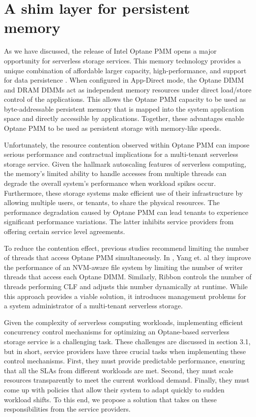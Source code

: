 \chapter[A shim Layer for persistent memory]{A shim layer for persistent memory}

As we have discussed, the release of Intel Optane PMM opens a major opportunity for serverless storage services. This memory technology provides a unique combination of affordable larger capacity, high-performance, and support for data persistence \cite{IntelOp15:online}. When configured in App-Direct mode, the Optane DIMM and DRAM DIMMs act as independent memory resources under direct load/store control of the applications. This allows the Optane PMM capacity to be used as byte-addressable persistent memory that is mapped into the system application space and directly accessible by applications. Together, these advantages enable Optane PMM to be used as persistent storage with memory-like speeds.

Unfortunately, the resource contention observed within Optane PMM can impose serious performance and contractual implications for a multi-tenant serverless storage service. Given the hallmark autoscaling features of serverless computing, the memory’s limited ability to handle accesses from multiple threads can degrade the overall system’s performance when workload spikes occur. Furthermore, these storage systems make efficient use of their infrastructure by allowing multiple users, or tenants, to share the physical resources. The performance degradation caused by Optane PMM can lead tenants to experience significant performance variations. The latter inhibits service providers from offering certain service level agreements.

To reduce the contention effect, previous studies recommend limiting the number of threads that access Optane PMM simultaneously. In \cite{yang2020empirical}, Yang et. al they improve the performance of an NVM-aware file system by limiting the number of writer threads that access each Optane DIMM. Similarly, Ribbon \cite{wu2020ribbon} controls the number of threads performing CLF and adjusts this number dynamically at runtime. While this approach provides a viable solution, it introduces management problems for a system administrator of a multi-tenant serverless storage.

Given the complexity of serverless computing workloads, implementing efficient concurrency control mechanisms for optimizing an Optane-based serverless storage service is a challenging task. These challenges are discussed in section 3.1, but in short, service providers have three crucial tasks when implementing these control mechanisms. First, they must provide predictable performance, ensuring that all the SLAs from different workloads are met. Second, they must scale resources transparently to meet the current workload demand. Finally, they must come up with policies that allow their system to adapt quickly to sudden workload shifts. To this end, we propose a solution that takes on these responsibilities from the service providers.

